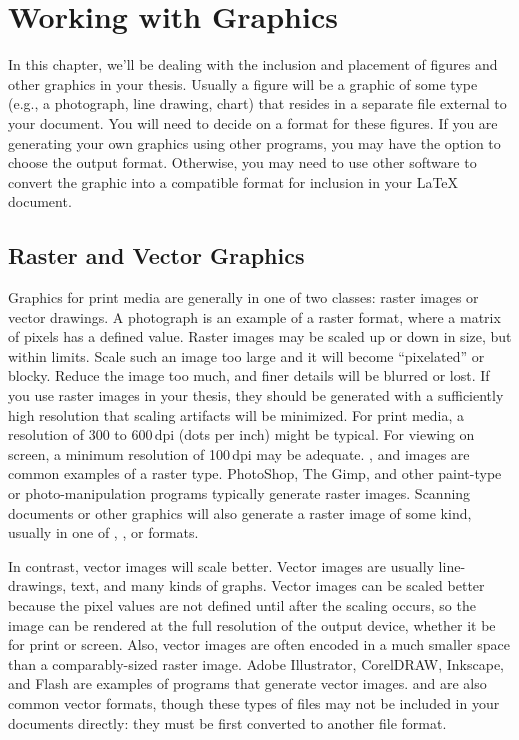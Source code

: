 
\chapter{Working with Graphics}

In this chapter, we'll be dealing with the inclusion and placement of
figures and other graphics in your thesis.  Usually a figure will be a
graphic of some type (e.g., a photograph, line drawing, chart) that
resides in a separate file external to your document.  You will need
to decide on a format for these figures.  If you are generating your
own graphics using other programs, you may have the option to choose
the output format.  Otherwise, you may need to use other software to
convert the graphic into a compatible format for inclusion in your
\LaTeX{} document.

\section{Raster and Vector Graphics}
Graphics for print media are generally in one of two classes: raster
images or vector drawings.  A  photograph is an example of
a raster format, where a matrix of pixels has a defined value.  Raster
images may be scaled up or down in size, but within limits. Scale such
an image too large and it will become ``pixelated'' or blocky.
Reduce the image too much, and finer details will be blurred or lost.
If you use raster images in your thesis, they should be generated with
a sufficiently high resolution that scaling artifacts will be
minimized.  For print media, a resolution of 300 to 600\,dpi (dots per
inch) might be typical.  For viewing on screen, a minimum resolution
of 100\,dpi may be adequate.  ,  and 
images are common examples of a raster type.  PhotoShop, The Gimp, and
other paint-type or photo-manipulation programs typically generate
raster images.  Scanning documents or other graphics will also
generate a raster image of some kind, usually in one of ,
, or  formats.

In contrast, vector images will scale better.  Vector images are
usually line-drawings, text, and many kinds of graphs.  Vector images
can be scaled better because the pixel values are not defined until
after the scaling occurs, so the image can be rendered at the full
resolution of the output device, whether it be for print or screen.
Also, vector images are often encoded in a much smaller space than a
comparably-sized raster image.  Adobe Illustrator, CorelDRAW,
Inkscape, and Flash are examples of programs that generate vector
images.   and  are also common vector formats,
though these types of files may not be included in your documents
directly: they must be first converted to another file format.

